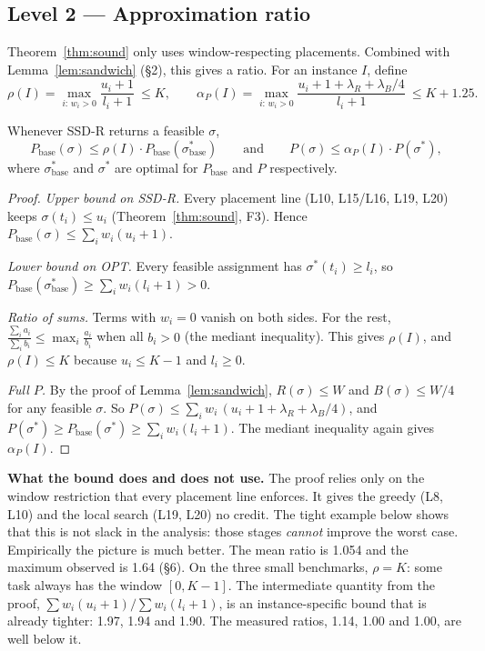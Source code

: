 \subsection{Level 2 --- Approximation ratio}
Theorem~\ref{thm:sound} only uses window-respecting placements. Combined
with Lemma~\ref{lem:sandwich} (\S2), this gives a ratio. For an instance
$I$, define
\[
\rho(I)=\max_{i:\,w_i>0}\frac{u_i+1}{l_i+1}\ \le K,
\qquad
\alpha_P(I)=\max_{i:\,w_i>0}\frac{u_i+1+\lambda_R+\lambda_B/4}{l_i+1}\ \le K+1.25 .
\]

\begin{theorem}[Ratio]\label{thm:ratio}
Whenever SSD-R returns a feasible $\sigma$,
\[
P_{\text{base}}(\sigma)\le\rho(I)\cdot P_{\text{base}}(\sigma^\ast_{\text{base}})
\qquad\text{and}\qquad
P(\sigma)\le\alpha_P(I)\cdot P(\sigma^\ast),
\]
where $\sigma^\ast_{\text{base}}$ and $\sigma^\ast$ are optimal for
$P_{\text{base}}$ and $P$ respectively.
\end{theorem}
\begin{proof}
\emph{Upper bound on SSD-R.} Every placement line (L10, L15/L16, L19, L20)
keeps $\sigma(t_i)\le u_i$ (Theorem~\ref{thm:sound}, F3). Hence
$P_{\text{base}}(\sigma)\le\sum_i w_i(u_i+1)$.

\emph{Lower bound on OPT.} Every feasible assignment has
$\sigma^\ast(t_i)\ge l_i$, so $P_{\text{base}}(\sigma^\ast_{\text{base}})\ge\sum_i w_i(l_i+1)>0$.

\emph{Ratio of sums.} Terms with $w_i=0$ vanish on both sides. For the
rest, $\frac{\sum_i a_i}{\sum_i b_i}\le\max_i\frac{a_i}{b_i}$ when all
$b_i>0$ (the mediant inequality). This gives $\rho(I)$, and $\rho(I)\le K$
because $u_i\le K-1$ and $l_i\ge0$.

\emph{Full $P$.} By the proof of Lemma~\ref{lem:sandwich},
$R(\sigma)\le W$ and $B(\sigma)\le W/4$ for any feasible $\sigma$. So
$P(\sigma)\le\sum_iw_i\,(u_i+1+\lambda_R+\lambda_B/4)$, and
$P(\sigma^\ast)\ge P_{\text{base}}(\sigma^\ast)\ge\sum_iw_i(l_i+1)$. The
mediant inequality again gives $\alpha_P(I)$.
\end{proof}

\textbf{What the bound does and does not use.} The proof relies only on
the window restriction that every placement line enforces. It gives the
greedy (L8, L10) and the local search (L19, L20) no credit. The tight
example below shows that this is not slack in the analysis: those stages
\emph{cannot} improve the worst case. Empirically the picture is much
better. The mean ratio is 1.054 and the maximum observed is 1.64 (\S6).
On the three small benchmarks, $\rho=K$: some task always has the window
$[0,K-1]$. The intermediate quantity from the proof,
$\sum w_i(u_i+1)/\sum w_i(l_i+1)$, is an instance-specific bound that is
already tighter: 1.97, 1.94 and 1.90. The measured ratios, 1.14, 1.00 and
1.00, are well below it.

